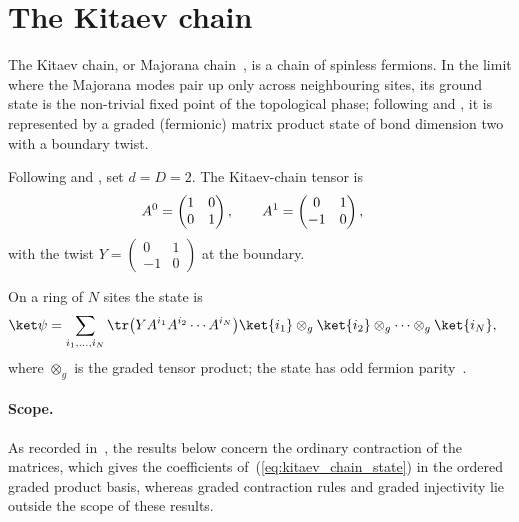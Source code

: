 \section{The Kitaev chain}\label{sec:kitaev_chain}

The Kitaev chain, or Majorana chain~\cite{Kitaev2001Majorana}, is a chain of
spinless fermions. In the limit where the Majorana modes pair up only across
neighbouring sites, its ground state is the non-trivial fixed point of the
topological phase; following
\cite[Appendix~A, ``The Kitaev chain'']{Cirac2021Matrix} and
\cite{Bultinck2017FermionicMPS}, it is represented by a graded (fermionic)
matrix product state of bond dimension two with a boundary twist.

\begin{definition}\label{def:kitaev_tensor}
    \leanok
    Following \cite[Appendix~A, ``The Kitaev chain'']{Cirac2021Matrix} and
    \cite{Bultinck2017FermionicMPS}, set $d=D=2$. The Kitaev-chain tensor is
    \begin{align}
        A^0 & = \begin{pmatrix}1&0\\0&1\end{pmatrix},
        \qquad
        A^1 = \begin{pmatrix}0&1\\-1&0\end{pmatrix},
        \notag
    \end{align}
    with the twist $Y=\begin{pmatrix}0&1\\-1&0\end{pmatrix}$ at the boundary.
\end{definition}

On a ring of $N$ sites the state is
\begin{align}
    \ket\psi
     & =
    \sum_{i_1,\ldots,i_N}\tr\bigl(YA^{i_1}A^{i_2}\cdots A^{i_N}\bigr)
    \ket{i_1}\otimes_g\ket{i_2}\otimes_g\cdots\otimes_g\ket{i_N},
    \label{eq:kitaev_chain_state}
\end{align}
where $\otimes_g$ is the graded tensor product; the state has odd fermion
parity~\cite[Section~II.B.4]{Cirac2021Matrix}.

\paragraph{Scope.} As recorded in~\cite{gap:rmp_kitaev_chain_bosonic_scope},
the results below concern the ordinary contraction of the matrices, which
gives the coefficients of~(\ref{eq:kitaev_chain_state}) in the ordered graded
product basis, whereas graded contraction rules and graded injectivity lie
outside the scope of these results.

